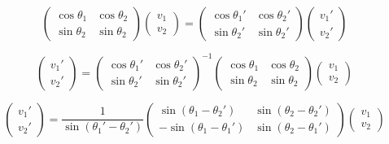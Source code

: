 \documentclass[a4paper,10pt]{article}
\title{}
\author{}
\date{}
\begin{document}
\begin{equation}
\begin{pmatrix}
    \cos\theta_1 & \cos\theta_2 \\    
    \sin\theta_2& \sin\theta_2
\end{pmatrix}
\begin{pmatrix}
    v_1\\
    v_2
\end{pmatrix}
=
\begin{pmatrix}
    \cos\theta_1' & \cos\theta_2' \\    
    \sin\theta_2'& \sin\theta_2'
\end{pmatrix}
\begin{pmatrix}
    v_1'\\
    v_2'
\end{pmatrix}
\end{equation}

\begin{equation}
\begin{pmatrix}
    v_1'\\
    v_2'
\end{pmatrix}
=
\begin{pmatrix}
    \cos\theta_1' & \cos\theta_2' \\    
    \sin\theta_2'& \sin\theta_2'
\end{pmatrix}
^{-1}
\begin{pmatrix}
    \cos\theta_1 & \cos\theta_2 \\    
    \sin\theta_2& \sin\theta_2
\end{pmatrix}
\begin{pmatrix}
    v_1\\
    v_2
\end{pmatrix}
\end{equation}

\begin{equation}
\begin{pmatrix}
    v_1'\\
    v_2'
\end{pmatrix}
=
\dfrac{1}{\sin(\theta_1'-\theta_2')}
\begin{pmatrix}
    \sin(\theta_1-\theta_2') & \sin(\theta_2-\theta_2') \\    
    -\sin(\theta_1-\theta_1')& \sin(\theta_2-\theta_1')
\end{pmatrix}
\begin{pmatrix}
    v_1\\
    v_2
\end{pmatrix}
\end{equation}
\end{document}
